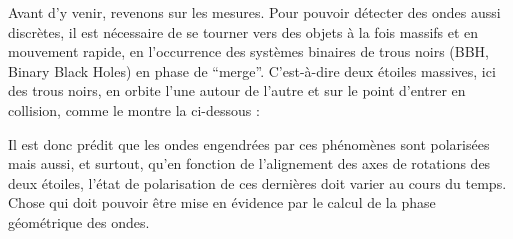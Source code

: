 Avant d'y venir, revenons sur les mesures. Pour pouvoir détecter des ondes aussi discrètes, il est nécessaire de se tourner vers des objets à la fois massifs et en mouvement rapide, en l'occurrence des systèmes binaires de trous noirs (BBH, Binary Black Holes) en phase de ``merge''. C'est-à-dire deux étoiles massives, ici des trous noirs, en orbite l'une autour de l'autre et sur le point d'entrer en collision, comme le montre la  ci-dessous :

\begin{figure}[h]
	
\end{figure}

Il est donc prédit que les ondes engendrées par ces phénomènes sont polarisées mais aussi, et surtout, qu'en fonction de l'alignement des axes de rotations des deux étoiles, l'état de polarisation de ces dernières doit varier au cours du temps. Chose qui doit pouvoir être mise en évidence par le calcul de la phase géométrique des ondes.
\\

